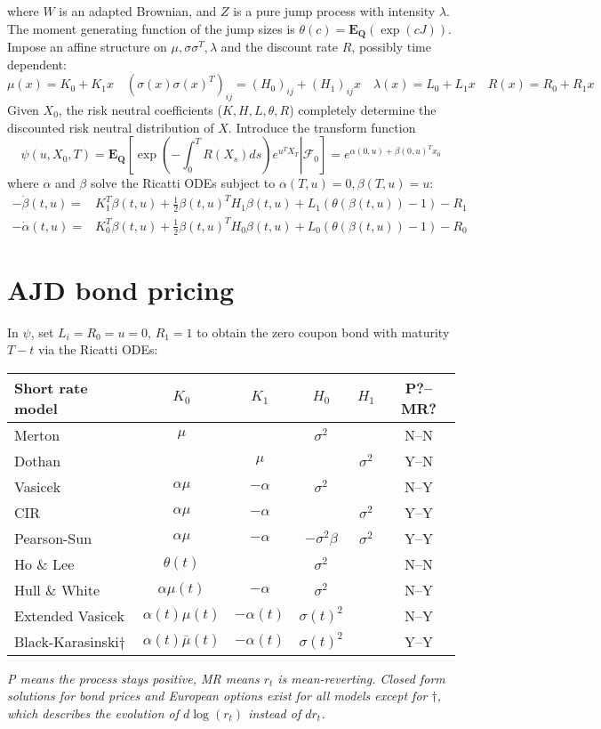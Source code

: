 \documentclass[twocolumn]{amsart}
\newcommand{\EQ}{\mathbf{E}_\mathbf{Q}}
\newcommand{\F}{\mathcal{F}}
\begin{document}
where $W$ is an adapted Brownian, and $Z$ is a pure jump process with intensity $\lambda$. The moment generating function of the jump sizes is $\theta(c)=\EQ(\exp(cJ))$. Impose an affine structure on $\mu,\sigma\sigma^T,\lambda$ and the discount rate $R$, possibly time dependent:
\begin{equation*}
\mu(x)=K_0+K_1x \quad (\sigma(x)\sigma(x)^T)_{ij}=(H_0)_{ij}+(H_1)_{ij}x
\quad \lambda(x)=L_0+L_1x \quad R(x)=R_0+R_1x
\end{equation*}
Given $X_0$, the risk neutral coefficients ($K,H,L,\theta,R$) completely determine the discounted risk neutral distribution of $X$. Introduce the transform function
\begin{equation*}
\psi(u,X_0,T)=\EQ\left[\left.\exp\left(-\int_0^{T}R(X_s)ds\right)e^{u^TX_T}\right|\F_0\right]=e^{\alpha(0,u)+\beta(0,u)^Tx_0}
\end{equation*}
where $\alpha$ and $\beta$ solve the Ricatti ODEs subject to $\alpha(T,u)=0,\beta(T,u)=u$:
\begin{align*}
-\dot{\beta}(t,u)=&K_1^T\beta(t,u)+\tfrac{1}{2}\beta(t,u)^TH_1\beta(t,u)+L_1(\theta(\beta(t,u))-1)-R_1\\
-\dot{\alpha}(t,u)=&K_0^T\beta(t,u)+\tfrac{1}{2}\beta(t,u)^TH_0\beta(t,u)+L_0(\theta(\beta(t,u))-1)-R_0
\end{align*}

\section*{AJD bond pricing} In $\psi$, set $L_i=R_0=u=0$, $R_1=1$ to obtain the zero coupon bond with maturity $T-t$ via the Ricatti ODEs:
\begin{center}
\begin{tabular}{|lccccc|}
\hline
Short rate model 	&$K_0$	&$K_1$	&$H_0$	&$H_1$	& P?--MR? \\
\hline
Merton	&$\mu$ 	& 	  	&$\sigma^2$&  	& N--N \\
Dothan  & 		& $\mu$ & 		&$\sigma^2$ & Y--N \\
Vasicek & $\alpha\mu$ &$-\alpha$ & $\sigma^2$&  & N--Y \\
CIR  	& $\alpha\mu$ &$-\alpha$ &  & $\sigma^2$& Y--Y \\
Pearson-Sun & $\alpha\mu$ & $-\alpha$ & $-\sigma^2\beta$&$\sigma^2 $ & Y--Y \\
Ho \& Lee &  $\theta(t)$ & & $\sigma^2$&  & N--N \\
Hull \& White & $\alpha\mu(t)$ & $-\alpha$ &  $\sigma^2$ & & N--Y \\
Extended Vasicek & $\alpha(t)\mu(t)$ &  $-\alpha(t)$ & $\sigma(t)^2$ & & N--Y\\
Black-Karasinski$\dagger$ & $\alpha(t)\bar{\mu}(t)$ & $-\alpha(t)$ & $\sigma(t)^2 $ & & Y--Y\\
\hline
\end{tabular}
\end{center}
\emph{P means the process stays positive, MR means $r_t$ is mean-reverting. Closed form solutions for bond prices and European options exist for all models except for $\dagger$, which describes the evolution of $d\log(r_t)$ instead of $dr_t$.}
\end{document}
